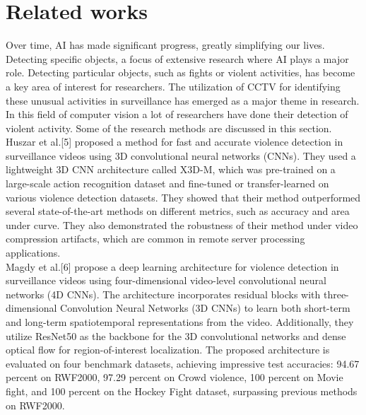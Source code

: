 \documentclass[conference]{IEEEtran}
\begin{document}
\section{Related works}

Over time, AI has made significant progress, greatly simplifying our lives. Detecting specific objects, a focus of extensive research where AI plays a major role. Detecting particular objects, such as fights or violent activities, has become a key area of interest for researchers. The utilization of CCTV for identifying these unusual activities in surveillance has emerged as a major theme in research. In this field of computer vision a lot of researchers have done their detection of violent activity. Some of the research methods are discussed in this section.\\

Huszar et al.[5] proposed a method for fast and accurate violence detection in surveillance videos using 3D convolutional neural networks (CNNs). They used a lightweight 3D CNN architecture called X3D-M, which was pre-trained on a large-scale action recognition dataset and fine-tuned or transfer-learned on various violence detection datasets. They showed that their method outperformed several state-of-the-art methods on different metrics, such as accuracy and area under curve. They also demonstrated the robustness of their method under video compression artifacts, which are common in remote server processing applications.\\

Magdy et al.[6] propose a deep learning architecture for violence detection in surveillance videos using four-dimensional video-level convolutional neural networks (4D CNNs). The architecture incorporates residual blocks with three-dimensional Convolution Neural Networks (3D CNNs) to learn both short-term and long-term spatiotemporal representations from the video. Additionally, they utilize ResNet50 as the backbone for the 3D convolutional networks and dense optical flow for region-of-interest localization. The proposed architecture is evaluated on four benchmark datasets, achieving impressive test accuracies: 94.67 percent on RWF2000, 97.29 percent on Crowd violence, 100 percent on Movie fight, and 100 percent on the Hockey Fight dataset, surpassing previous methods on RWF2000.\\
\end{document}
